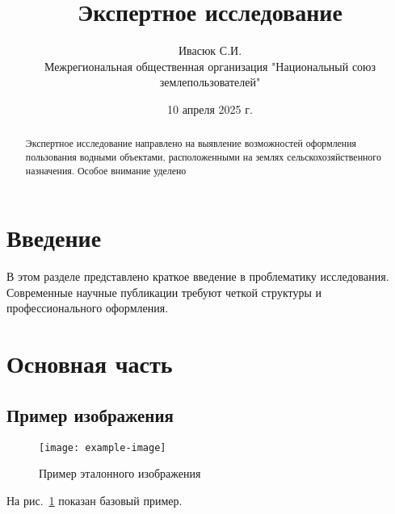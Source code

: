 \title{Экспертное исследование}
\author{Ивасюк С.И. \\ Межрегиональная общественная организация "Национальный союз землепользователей"}
\date{10 апреля 2025 г.}
\maketitle

\begin{abstract}
Экспертное исследование направлено на выявление возможностей оформления пользования водными объектами, расположенными на землях сельскохозяйственного назначения. Особое внимание уделено  
\end{abstract}

\tableofcontents


\section{Введение}
\label{sec:intro}

В этом разделе представлено краткое введение в проблематику исследования. Современные научные публикации требуют четкой структуры и профессионального оформления.

\section{Основная часть}
\label{sec:main}

\subsection{Пример изображения}
\label{subsec:image}

\begin{figure}[H]
    \centering
    \texttt{[image: example-image]}
    \caption{Пример эталонного изображения}
    \label{fig:example-ref}
\end{figure}




На рис.~\ref{fig:example-ref} показан базовый пример.

